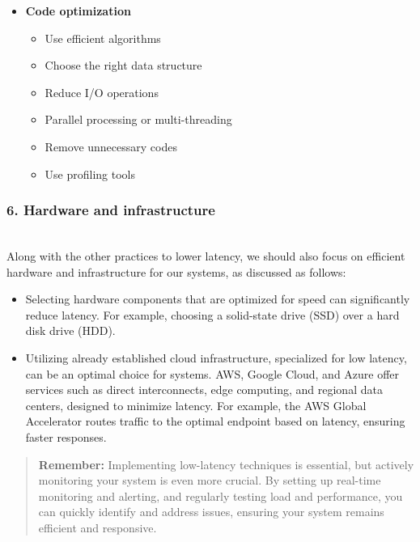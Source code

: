 \begin{center}
\end{center}

\vspace{0.3cm}
\begin{itemize}
\item \textbf{Code optimization}
\begin{itemize}
\item Use efficient algorithms
\item Choose the right data structure
\item Reduce I/O operations
\item Parallel processing or multi-threading
\item Remove unnecessary codes
\item Use profiling tools
\end{itemize}
\end{itemize}

\subsubsection{6. Hardware and infrastructure}\label{SnjrTxLJMav4qV0nXy4Jc}
\\
Along with the other practices to lower latency, we should also focus on efficient hardware and infrastructure for our systems, as discussed as follows:

\begin{itemize}
\item
\protect{}\label{xeZnJzXa3wriMjGbhT8M_}
Selecting hardware components that are optimized for speed can significantly reduce latency. For example, choosing a solid-state drive (SSD) over a hard disk drive (HDD).
\item
\protect{}\label{Q8LkQekDWnWizxrU5HOcr}
Utilizing already established cloud infrastructure, specialized for low latency, can be an optimal choice for systems. AWS, Google Cloud, and Azure offer services such as direct interconnects, edge computing, and regional data centers, designed to minimize latency. For example, the AWS Global Accelerator routes traffic to the optimal endpoint based on latency, ensuring faster responses.
\end{itemize}
\begin{quote}
\textbf{Remember:} Implementing low-latency techniques is essential, but actively monitoring your system is even more crucial. By setting up real-time monitoring and alerting, and regularly testing load and performance, you can quickly identify and address issues, ensuring your system remains efficient and responsive.
\end{quote}
